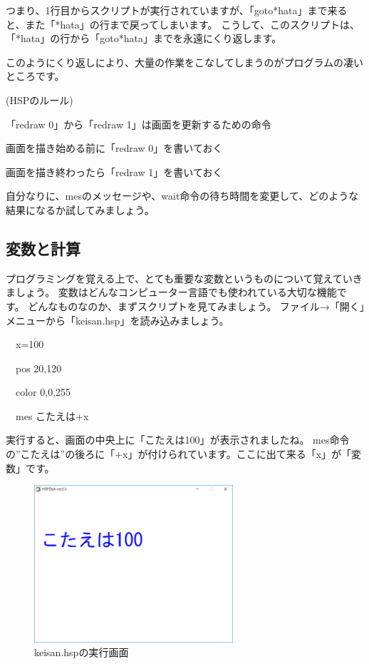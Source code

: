 つまり、1行目からスクリプトが実行されていますが、「goto*hata」まで来ると、また「*hata」の行まで戻ってしまいます。
こうして、このスクリプトは、「*hata」の行から「goto*hata」までを永遠にくり返します。

このようにくり返しにより、大量の作業をこなしてしまうのがプログラムの凄いところです。

\begin{description}
    \item (HSPのルール)
\end{description}

\begin{description}
    \item 「redraw 0」から「redraw 1」は画面を更新するための命令
    \item 画面を描き始める前に「redraw 0」を書いておく
    \item 画面を描き終わったら「redraw 1」を書いておく
\end{description}

自分なりに、mesのメッセージや、wait命令の待ち時間を変更して、どのような結果になるか試してみましょう。

\subsection{変数と計算}

プログラミングを覚える上で、とても重要な変数というものについて覚えていきましょう。
変数はどんなコンピューター言語でも使われている大切な機能です。
どんなものなのか、まずスクリプトを見てみましょう。
ファイル→「開く」メニューから「keisan.hsp」を読み込みましょう。

\begin{description}
    \item \ \ x=100
    \item \ \ pos 20,120
    \item \ \ color 0,0,255
    \item \ \ mes {\textquotedbl}こたえは{\textquotedbl}+x
\end{description}

実行すると、画面の中央上に「こたえは100」が表示されましたね。
mes命令の”こたえは”の後ろに「+x」が付けられています。ここに出て来る「x」が「変数」です。

\begin{figure}[H]
    \begin{center}
        \includegraphics[keepaspectratio,width=7.382cm,height=5.831cm]{text02-img/text02-img044.png}
        \caption{keisan.hspの実行画面}
    \end{center}
\end{figure}

